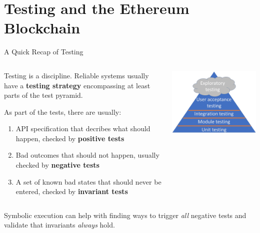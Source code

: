 \documentclass[aspectratio=169]{beamer}
\begin{document}
\section{Testing and the Ethereum Blockchain}
\begin{frame}{A Quick Recap of Testing}

\begin{columns}
\begin{column}{0.7\textwidth}
   Testing is a discipline. Reliable systems usually have a \textbf{testing strategy} encompassing at least parts of the test pyramid.
   
   As part of the tests, there are usually:
   \begin{enumerate}
   \item API specification that decribes what should happen, checked by 
   \textbf{positive tests}
   \item Bad outcomes that should not happen, usually checked by  \textbf{negative tests}
   \item A set of known bad states that should never be entered, checked by \textbf{invariant tests}
   \end{enumerate} 
\end{column}
\begin{column}{0.3\textwidth}  %
    \begin{center}
     \includegraphics[scale=0.45]{triangle3.png}
     \end{center}
\end{column}
\end{columns}
\bigskip


Symbolic execution can help with finding ways to trigger \emph{all} negative tests and validate that invariants \emph{always} hold.

\end{frame}
\end{document}
